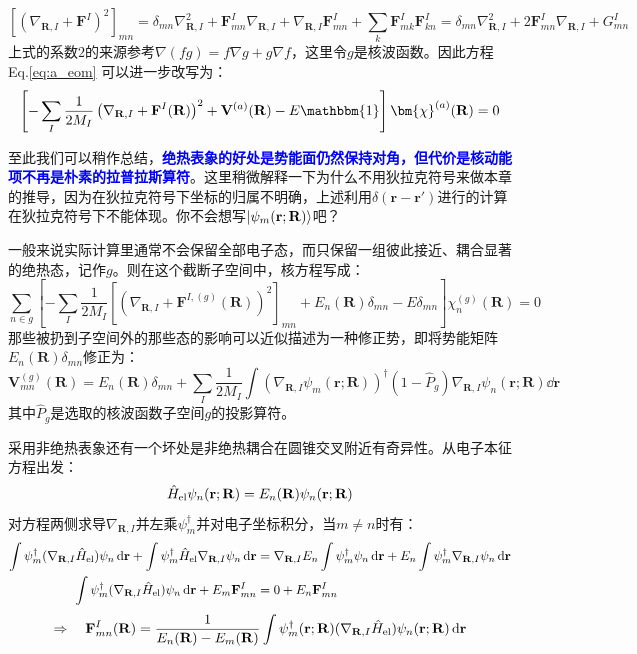 \[\left[\left(\nabla_{\mathbf{R},I}+\mathbf{F}^I\right)^2\right]_{mn}=\delta_{mn}\nabla_{\mathbf{R},I}^2+\mathbf{F}_{mn}^I\nabla_{\mathbf{R},I}+\nabla_{\mathbf{R},I}\mathbf{F}_{mn}^I+\sum_k\mathbf{F}_{mk}^I\mathbf{F}_{kn}^I=\delta_{mn}\nabla_{\mathbf{R},I}^2+2\mathbf{F}_{mn}^I\nabla_{\mathbf{R},I}+G_{mn}^I\]
上式的系数$2$的来源参考$\nabla(fg)=f\nabla g+g\nabla f$，这里令$g$是核波函数。因此方程 Eq.\eqref{eq:a_eom} 可以进一步改写为：
\begin{equation}
\left[-\sum_I\frac{1}{2M_I}\left(\nabla_{\mathbf{R},I}+\mathbf{F}^I(\mathbf{R})\right)^2+\mathbf{V}^{(a)}(\mathbf{R})-E\mathbbm{1}\right]\bm{\chi}^{(a)}(\mathbf{R})=0
\end{equation}

至此我们可以稍作总结，\textcolor{blue}{\textbf{绝热表象的好处是势能面仍然保持对角，但代价是核动能项不再是朴素的拉普拉斯算符}}。这里稍微解释一下为什么不用狄拉克符号来做本章的推导，因为在狄拉克符号下坐标的归属不明确，上述利用$\delta(\mathbf{r}-\mathbf{r}')$进行的计算在狄拉克符号下不能体现。你不会想写$\ket{\psi_m(\mathbf{r};\mathbf{R})}$吧？

一般来说实际计算里通常不会保留全部电子态，而只保留一组彼此接近、耦合显著的绝热态，记作$g$。则在这个截断子空间中，核方程写成：
\[\sum_{n\in g}\left[-\sum_I\frac{1}{2M_I}\left[\left(\nabla_{\mathbf{R},I}+\mathbf{F}^{I,(g)}(\mathbf{R})\right)^2\right]_{mn}+E_n(\mathbf{R})\delta_{mn}-E\delta_{mn}\right]\chi_n^{(g)}(\mathbf{R})=0\]
那些被扔到子空间外的那些态的影响可以近似描述为一种修正势，即将势能矩阵$E_n(\mathbf{R})\delta_{mn}$修正为：
\[\mathbf{V}_{mn}^{(g)}(\mathbf{R})=E_n(\mathbf{R})\delta_{mn}+\sum_I\frac{1}{2M_I}\int\left(\nabla_{\mathbf{R},I}\psi_m(\mathbf{r};\mathbf{R})\right)^{\dagger}\left(1-\hat{P}_g\right)\nabla_{\mathbf{R},I}\psi_n(\mathbf{r};\mathbf{R})\dd{\mathbf{r}}\]
其中$\hat{P}_g$是选取的核波函数子空间$g$的投影算符。

采用非绝热表象还有一个坏处是非绝热耦合在圆锥交叉附近有奇异性。从电子本征方程出发：
\[\hat{H}_{\rm el}\psi_n(\mathbf{r};\mathbf{R})=E_n(\mathbf{R})\psi_n(\mathbf{r};\mathbf{R})\]
对方程两侧求导$\nabla_{\mathbf{R},I}$并左乘$\psi_m^{\dagger}$并对电子坐标积分，当$m\neq n$时有：
\[\begin{aligned}
\int\psi_m^{\dagger}(\nabla_{\mathbf{R},I}\hat{H}_{\rm el})\psi_n\dd{\mathbf{r}}+\int\psi_m^{\dagger}\hat{H}_{\rm el}\nabla_{\mathbf{R},I}\psi_n\dd{\mathbf{r}}&=\nabla_{\mathbf{R},I}E_n\int\psi_m^{\dagger}\psi_n\dd{\mathbf{r}}+E_n\int\psi_m^{\dagger}\nabla_{\mathbf{R},I}\psi_n\dd{\mathbf{r}}\\
\int\psi_m^{\dagger}(\nabla_{\mathbf{R},I}\hat{H}_{\rm el})\psi_n\dd{\mathbf{r}}+E_m\mathbf{F}_{mn}^I&=0+E_n\mathbf{F}_{mn}^I\\
\end{aligned}\]
\[\Rightarrow \quad \mathbf{F}_{mn}^I(\mathbf{R})=\frac{1}{E_n(\mathbf{R})-E_m(\mathbf{R})}\int\psi_m^{\dagger}(\mathbf{r};\mathbf{R})(\nabla_{\mathbf{R},I}\hat{H}_{\rm el})\psi_n(\mathbf{r};\mathbf{R})\dd{\mathbf{r}}\]

